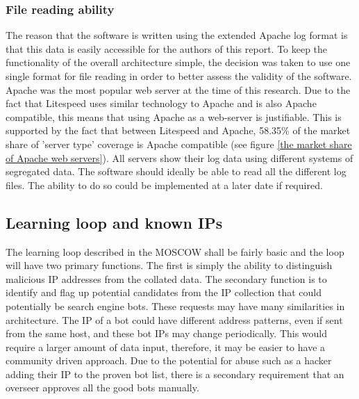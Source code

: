 \subsubsection*{File reading ability}
The reason that the software is written using the extended Apache log format is that this data is easily accessible for the authors of this report. To keep the functionality of the overall architecture simple, the decision was taken to use one single format for file reading in order to better assess the validity of the software. Apache was the most popular web server at the time of this research. Due to the fact that Litespeed uses similar technology to Apache and is also Apache compatible, this means that using Apache as a web-server is justifiable. This is supported by the fact that between Litespeed and Apache, 58.35\% of the market share of 'server type' coverage is Apache compatible (see figure \ref{the market share of Apache web servers}). All servers show their log data using different systems of segregated data. The software should ideally be able to read all the different log files. The ability to do so could be implemented at a later date if required. 

\subsection*{Learning loop and known IPs} \label{Learning loop and known IP's}

The learning loop described in the MOSCOW shall be fairly basic and the loop will have two primary functions. The first is simply the ability to distinguish malicious IP addresses from the collated data. The secondary function is to identify and flag up potential candidates from the IP collection that could potentially be search engine bots. These requests may have many similarities in architecture. The IP of a bot could have different address patterns, even if sent from the same host, and these bot IPs may change periodically. This would require a larger amount of data input, therefore, it may be easier to have a community driven approach. Due to the potential for abuse such as a hacker adding their IP to the proven bot list, there is a secondary requirement that an overseer approves all the good bots manually.

